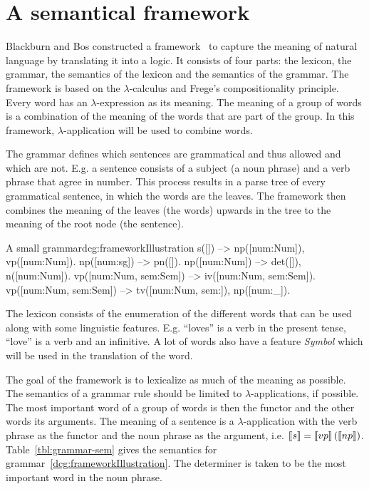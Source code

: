 \section{A semantical framework}
Blackburn and Bos constructed a framework~\cite{Blackburn2005, Blackburn2006} to capture the meaning of natural language by translating it into a logic. It consists of four parts: the lexicon, the grammar, the semantics of the lexicon and the semantics of the grammar. The framework is based on the $\lambda$-calculus and Frege's compositionality principle. Every word has an $\lambda$-expression as its meaning. The meaning of a group of words is a combination of the meaning of the words that are part of the group. In this framework, $\lambda$-application will be used to combine words.

The grammar defines which sentences are grammatical and thus allowed and which are not. E.g. a sentence consists of a subject (a noun phrase) and a verb phrase that agree in number. This process results in a parse tree of every grammatical sentence, in which the words are the leaves. The framework then combines the meaning of the leaves (the words) upwards in the tree to the meaning of the root node (the sentence).

\begin{dcg}{A small grammar}{dcg:frameworkIllustration}
s([]) -->
  np([num:Num]),
  vp([num:Num]).
np([num:sg]) -->
  pn([]).
np([num:Num]) -->
  det([]),
  n([num:Num]).
vp([num:Num, sem:Sem]) -->
  iv([num:Num, sem:Sem]).
vp([num:Num, sem:Sem]) -->
  tv([num:Num, sem:]),
  np([num:_]).
\end{dcg}

The lexicon consists of the enumeration of the different words that can be used along with some linguistic features. E.g. ``loves'' is a verb in the present tense, ``love'' is a verb and an infinitive. A lot of words also have a feature \textit{Symbol} which will be used in the translation of the word.

The goal of the framework is to lexicalize as much of the meaning as possible. The semantics of a grammar rule should be limited to $\lambda$-applications, if possible. The most important word of a group of words is then the functor and the other words its arguments. The meaning of a sentence is a $\lambda$-application with the verb phrase as the functor and the noun phrase as the argument, i.e. $\llbracket s \rrbracket = \llbracket vp \rrbracket \left( \llbracket np \rrbracket \right)$. Table~\ref{tbl:grammar-sem} gives the semantics for grammar~\ref{dcg:frameworkIllustration}. The determiner is taken to be the most important word in the noun phrase.

